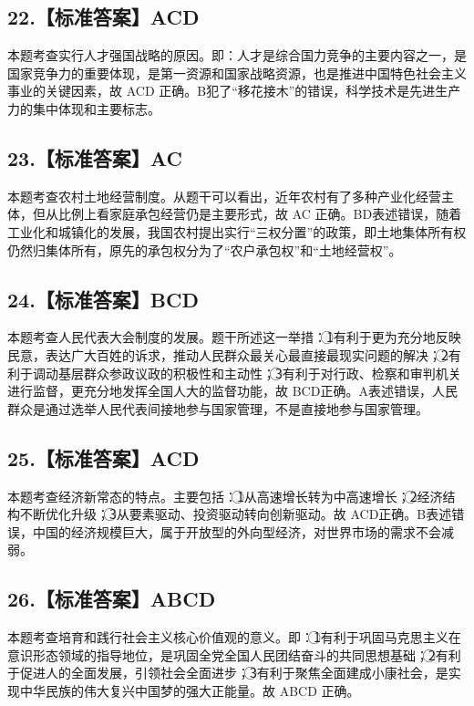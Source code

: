 \documentclass[UTF8,11pt]{ctexart}
\begin{document}
\subsection*{22.【标准答案】ACD}

本题考查实行人才强国战略的原因。即：人才是综合国力竞争的主要内容之一，是国家竞争力的重要体现，是第一资源和国家战略资源，也是推进中国特色社会主义事业的关键因素，故 ACD 正确。B犯了“移花接木”的错误，科学技术是先进生产力的集中体现和主要标志。


\subsection*{23.【标准答案】AC}

本题考查农村土地经营制度。从题干可以看出，近年农村有了多种产业化经营主体，但从比例上看家庭承包经营仍是主要形式，故 AC 正确。BD表述错误，随着工业化和城镇化的发展，我国农村提出实行“三权分置”的政策，即土地集体所有权仍然归集体所有，原先的承包权分为了“农户承包权”和“土地经营权”。


\subsection*{24.【标准答案】BCD}

本题考查人民代表大会制度的发展。题干所述这一举措：\textcircled{1}有利于更为充分地反映民意，表达广大百姓的诉求，推动人民群众最关心最直接最现实问题的解决；\textcircled{2}有利于调动基层群众参政议政的积极性和主动性；\textcircled{3}有利于对行政、检察和审判机关进行监督，更充分地发挥全国人大的监督功能，故 BCD正确。A表述错误，人民群众是通过选举人民代表间接地参与国家管理，不是直接地参与国家管理。


\subsection*{25.【标准答案】ACD}

本题考查经济新常态的特点。主要包括：\textcircled{1}从高速增长转为中高速增长；\textcircled{2}经济结构不断优化升级；\textcircled{3}从要素驱动、投资驱动转向创新驱动。故 ACD正确。B表述错误，中国的经济规模巨大，属于开放型的外向型经济，对世界市场的需求不会减弱。


\subsection*{26.【标准答案】ABCD}

本题考查培育和践行社会主义核心价值观的意义。即：\textcircled{1}有利于巩固马克思主义在意识形态领域的指导地位，是巩固全党全国人民团结奋斗的共同思想基础；\textcircled{2}有利于促进人的全面发展，引领社会全面进步；\textcircled{3}有利于聚焦全面建成小康社会，是实现中华民族的伟大复兴中国梦的强大正能量。故 ABCD 正确。
\end{document}
